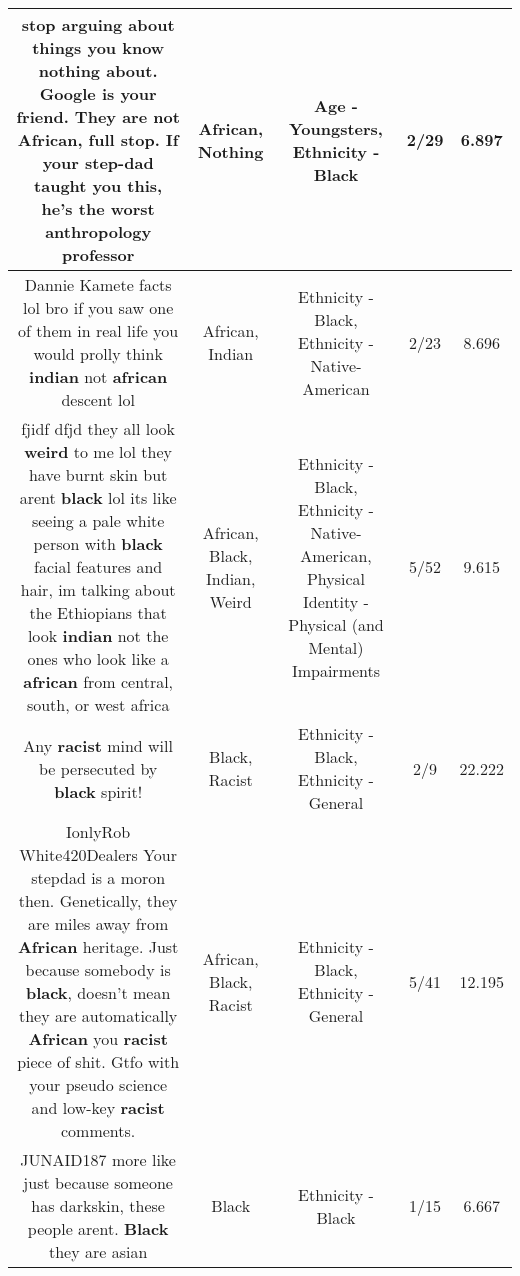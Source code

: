 \documentclass[11pt]{article}
\newlength\mylength
\begin{document}
\begin{center}
\begin{longtable}{|C{.65\mylength}|C{.30\mylength}|C{.12\mylength}|C{.12\mylength}|C{.12\mylength}|}
  \small stop arguing about things you know \textbf{nothing} about. Google is your friend. They are not \textbf{African}, full stop. If your step-dad taught you this, he's the worst anthropology professor\normalsize   & African, Nothing & Age - Youngsters, Ethnicity - Black & 2/29 & 6.897 \\  \hline
  \small Dannie Kamete facts lol bro if you saw one of them in real life you would prolly think \textbf{indian} not \textbf{african} descent lol\normalsize   & African, Indian & Ethnicity - Black, Ethnicity - Native-American & 2/23 & 8.696 \\  \hline
  \small fjidf dfjd they all look \textbf{weird} to me lol they have burnt skin but arent \textbf{black} lol its like seeing a pale white person with \textbf{black} facial  features and hair, im talking about the Ethiopians that look \textbf{indian} not the ones who look like a \textbf{african} from central, south, or west africa\normalsize   & African, Black, Indian, Weird & Ethnicity - Black, Ethnicity - Native-American, Physical Identity - Physical (and Mental) Impairments & 5/52 & 9.615 \\  \hline
  \small Any \textbf{racist} mind will be persecuted by \textbf{black} spirit!\normalsize   & Black, Racist & Ethnicity - Black, Ethnicity - General & 2/9 & 22.222 \\  \hline
  \small IonlyRob White420Dealers Your stepdad is a moron then. Genetically, they are miles away from \textbf{African} heritage. Just because somebody is \textbf{black}, doesn't mean they are automatically \textbf{African} you \textbf{racist} piece of shit. Gtfo with your pseudo science and low-key \textbf{racist} comments.\normalsize   & African, Black, Racist & Ethnicity - Black, Ethnicity - General & 5/41 & 12.195 \\  \hline
  \small JUNAID187 more like just because someone has darkskin, these people arent. \textbf{Black} they are asian\normalsize   & Black & Ethnicity - Black & 1/15 & 6.667 \\  \hline

\end{longtable}
\end{center}
\end{document}
